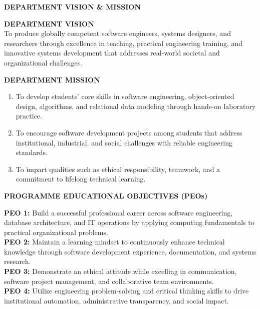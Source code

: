 \documentclass[12pt,a4paper]{report}
\begin{document}
\newpage

\begin{center}
{\Large \textbf{DEPARTMENT VISION \& MISSION}\par}
\end{center}
\vspace{0.4cm}

\noindent \textbf{DEPARTMENT VISION}\\
To produce globally competent software engineers, systems designers, and researchers through excellence in teaching, practical engineering training, and innovative systems development that addresses real-world societal and organizational challenges.

\vspace{0.5cm}
\noindent \textbf{DEPARTMENT MISSION}
\begin{enumerate}
\item To develop students' core skills in software engineering, object-oriented design, algorithms, and relational data modeling through hands-on laboratory practice.
\item To encourage software development projects among students that address institutional, industrial, and social challenges with reliable engineering standards.
\item To impart qualities such as ethical responsibility, teamwork, and a commitment to lifelong technical learning.
\end{enumerate}

\vspace{0.6cm}
\begin{center}
{\Large \textbf{PROGRAMME EDUCATIONAL OBJECTIVES (PEOs)}\par}
\end{center}
\vspace{0.3cm}

\noindent \textbf{PEO 1:} Build a successful professional career across software engineering, database architecture, and IT operations by applying computing fundamentals to practical organizational problems.\\[0.2cm]
\noindent \textbf{PEO 2:} Maintain a learning mindset to continuously enhance technical knowledge through software development experience, documentation, and systems research.\\[0.2cm]
\noindent \textbf{PEO 3:} Demonstrate an ethical attitude while excelling in communication, software project management, and collaborative team environments.\\[0.2cm]
\noindent \textbf{PEO 4:} Utilize engineering problem-solving and critical thinking skills to drive institutional automation, administrative transparency, and social impact.
\end{document}
